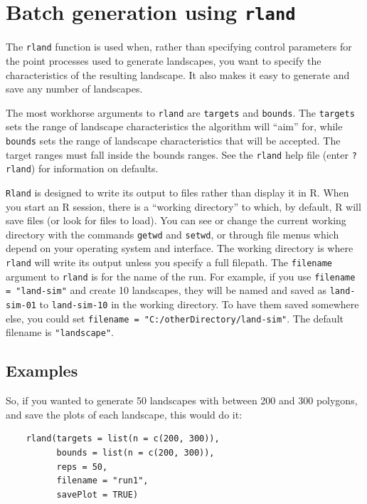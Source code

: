 \documentclass{article}\usepackage{graphicx, color}
\newcommand{\code}[1]{{\tt #1}}
\begin{document}
\section{Batch generation using \code{rland}}

The \code{rland} function is used when, rather than specifying control parameters for the
point processes used to generate landscapes, you want to specify the characteristics of the
resulting landscape. It also makes it easy to generate and save any number of landscapes.

The most workhorse arguments to \code{rland} are \code{targets} and \code{bounds}.
The \code{targets} sets the range of landscape characteristics the algorithm will ``aim'' for, while
\code{bounds} sets the range of landscape characteristics that will be accepted.
The target ranges must fall inside the bounds ranges.
See the \code{rland} help file (enter \code{?rland}) for information on defaults.

\code{Rland} is designed to write its output to files rather than display it in R. 
When you start an R session, there is a ``working directory'' to which, by default, R will save
files (or look for files to load).
You can see or change the current working directory with the commands
\code{getwd} and \code{setwd}, or through file menus which depend on your operating system
and interface.
The working directory is where \code{rland} will write its output unless you specify a full filepath.
The \code{filename} argument to \code{rland} is for the name of the run.
For example, if you use \verb|filename = "land-sim"|
and create 10 landscapes, they will be named
and saved as \code{land-sim-01} to \code{land-sim-10} in the working directory.
To have them saved somewhere else, you could set
\verb|filename = "C:/otherDirectory/land-sim"|.
The default filename is \code{"landscape"}.

\subsection{Examples}
So, if you wanted to generate 50 landscapes with between 200 and 300 polygons, 
and save the plots of each landscape, this would do it:

\begin{verbatim}
    rland(targets = list(n = c(200, 300)),
          bounds = list(n = c(200, 300)),
          reps = 50,
          filename = "run1",
          savePlot = TRUE)
\end{verbatim}
\end{document}
